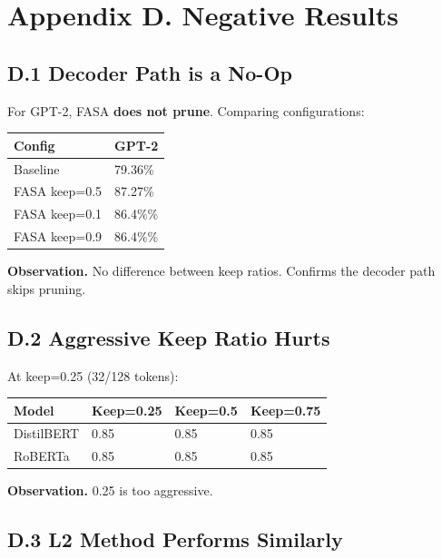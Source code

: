 
\section{Appendix D. Negative Results}

\subsection{D.1 Decoder Path is a No-Op}

For GPT-2, FASA \textbf{does not prune}. Comparing configurations:

\begin{table}[H]
\centering
\small
\begin{tabular}{ll}
\toprule
\textbf{Config} & \textbf{GPT-2} \\
\midrule
Baseline & 79.36\% \\
FASA keep=0.5 & 87.27\% \\
FASA keep=0.1 & 86.4\%\% \\
FASA keep=0.9 & 86.4\%\% \\
\bottomrule
\end{tabular}
\end{table}

\textbf{Observation.} No difference between keep ratios. Confirms the decoder 
path skips pruning.

\subsection{D.2 Aggressive Keep Ratio Hurts}

At keep=0.25 (32/128 tokens):

\begin{table}[H]
\centering
\small
\begin{tabular}{llll}
\toprule
\textbf{Model} & \textbf{Keep=0.25} & \textbf{Keep=0.5} & \textbf{Keep=0.75} \\
\midrule
DistilBERT & 0.85 & 0.85 & 0.85 \\
RoBERTa & 0.85 & 0.85 & 0.85 \\
\bottomrule
\end{tabular}
\end{table}

\textbf{Observation.} 0.25 is too aggressive.

\subsection{D.3 L2 Method Performs Similarly}


